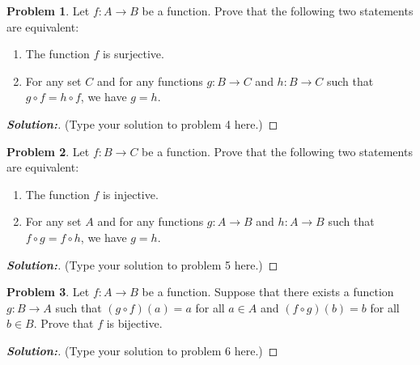 \documentclass[12pt]{article}
\theoremstyle{definition}\newtheorem{problem}{Problem}
\newenvironment{solution}{\begin{proof}[\bfseries\textup{Solution:}]}{\end{proof}}
\begin{document}
\newpage
\begin{problem}
Let $f : A\to B$ be a function.  Prove that the following two statements are equivalent:
\begin{enumerate}
\item The function $f$ is surjective.
\item For any set $C$ and for any functions $g: B \to C$ and $h : B \to C$ such that $g\circ f = h\circ f$, we have $g = h$.
\end{enumerate}
\end{problem}
\begin{solution}
(Type your solution to problem 4 here.)
\end{solution}

\newpage
\begin{problem}
Let $f : B\to C$ be a function.  Prove that the following two statements are equivalent:
\begin{enumerate}
\item The function $f$ is injective.
\item For any set $A$ and for any functions $g: A \to B$ and $h : A \to B$ such that $f\circ g = f\circ h$, we have $g = h$.
\end{enumerate}
\end{problem}
\begin{solution}
(Type your solution to problem 5 here.)
\end{solution}

\newpage
\begin{problem}
Let $f:A\to B$ be a function.  Suppose that there exists a function $g:B\to A$ such that $(g\circ f)(a) = a$ for all $a\in A$ and $(f\circ g)(b) = b$ for all $b\in B$.  Prove that $f$ is bijective.
\end{problem}
\begin{solution}
(Type your solution to problem 6 here.)
\end{solution}
\end{document}
